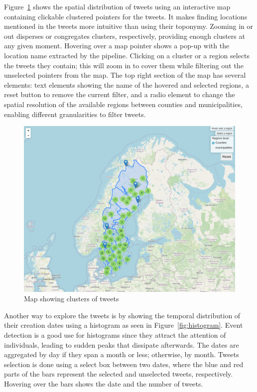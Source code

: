 Figure~\ref{fig:map} shows the spatial distribution of tweets using an interactive map containing
clickable clustered pointers for the tweets. It makes finding locations mentioned in the tweets more
intuitive than using their toponymy. Zooming in or out disperses or congregates clusters,
respectively, providing enough clusters at any given moment. Hovering over a map pointer
shows a pop-up with the location name extracted by the pipeline. Clicking on a cluster or a region
selects the tweets they contain; this will zoom in to cover them while filtering out the unselected
pointers from the map. The top right section of the map has several elements: text elements showing
the name of the hovered and selected regions, a reset button to remove the current filter, and a
radio element to change the spatial resolution of the available regions between counties and
municipalities, enabling different granularities to filter tweets.

\begin{figure}[H]
\begin{center}
  \includegraphics[width=\columnwidth]{./images/map.png}
\end{center}
\caption{Map showing clusters of tweets}
\label{fig:map}
\end{figure}

Another way to explore the tweets is by showing the temporal distribution of their creation dates
using a histogram as seen in Figure~\ref{fig:histogram}. Event detection is a good use for
histograms since they attract the attention of individuals, leading to sudden peaks that dissipate
afterwards. The dates are aggregated by day if they span a month or less; otherwise, by month.
Tweets selection is done using a select box between two dates, where the blue and red parts of the
bars represent the selected and unselected tweets, respectively. Hovering over the bars shows the
date and the number of tweets.

